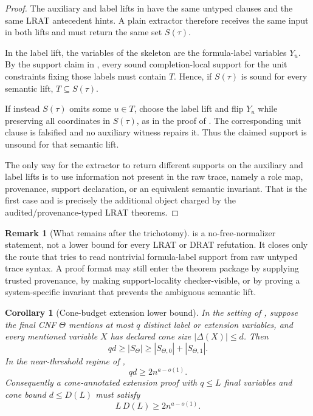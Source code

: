 \documentclass[11pt]{article}
\newtheorem{corollary}[theorem]{Corollary}
\theoremstyle{definition}
\newtheorem{remark}[theorem]{Remark}
\begin{document}
\begin{proof}
The auxiliary and label lifts in  have the same untyped clauses and the same LRAT antecedent hints.  A plain extractor therefore receives the same input in both lifts and must return the same set \(S(\tau)\).

In the label lift, the variables of the skeleton are the formula-label variables \(Y_u\).  By the support claim in , every sound completion-local support for the unit constraints fixing those labels must contain \(T\).  Hence, if \(S(\tau)\) is sound for every semantic lift, \(T\subseteq S(\tau)\).

If instead \(S(\tau)\) omits some \(u\in T\), choose the label lift and flip \(Y_u\) while preserving all coordinates in \(S(\tau)\), as in the proof of .  The corresponding unit clause is falsified and no auxiliary witness repairs it.  Thus the claimed support is unsound for that semantic lift.

The only way for the extractor to return different supports on the auxiliary and label lifts is to use information not present in the raw trace, namely a role map, provenance, support declaration, or an equivalent semantic invariant.  That is the first case and is precisely the additional object charged by the audited/provenance-typed LRAT theorems.
\end{proof}

\begin{remark}[What remains after the trichotomy]\label{rem:plain-lrat-trichotomy-scope}
 is a no-free-normalizer statement, not a lower bound for every LRAT or DRAT refutation.  It closes only the route that tries to read nontrivial formula-label support from raw untyped trace syntax.  A proof format may still enter the theorem package by supplying trusted provenance, by making support-locality checker-visible, or by proving a system-specific invariant that prevents the ambiguous semantic lift.
\end{remark}

\begin{corollary}[Cone-budget extension lower bound]\label{cor:cone-budget-extension}
In the setting of , suppose the final CNF \(\Theta\) mentions at most \(q\) distinct label or extension variables, and every mentioned variable \(X\) has declared cone size \(|\Delta(X)|\le d\).  Then
\[
  qd\ge |S_\Theta|\ge |S_{\Theta,0}|+|S_{\Theta,1}|.
\]
In the near-threshold regime of ,
\[
  qd\ge 2n^{a-o(1)}.
\]
Consequently a cone-annotated extension proof with \(q\le L\) final variables and cone bound \(d\le D(L)\) must satisfy
\[
  L\,D(L)\ge 2n^{a-o(1)}.
\]
\end{corollary}
\end{document}
